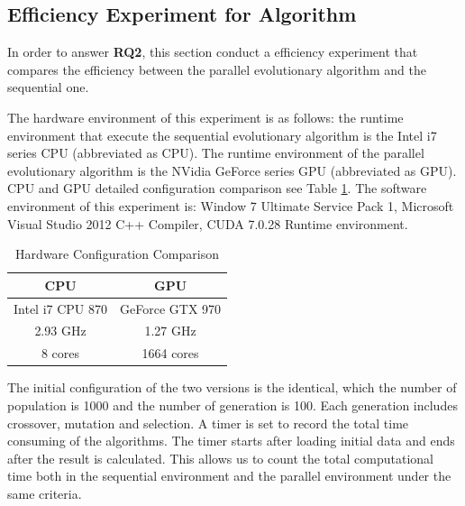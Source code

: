 \subsection{Efficiency Experiment for Algorithm}
%
In order to answer \textbf{RQ2}, this section conduct a efficiency experiment
that compares the efficiency between the parallel evolutionary algorithm and the
sequential one.

The hardware environment of this experiment is as follows: the runtime
environment that execute the sequential evolutionary algorithm is the Intel i7
series CPU (abbreviated as CPU). The runtime environment of the parallel
evolutionary algorithm is the NVidia GeForce series GPU (abbreviated as GPU).
CPU and GPU detailed configuration comparison see Table \ref{tab:cpugpu}. The
software environment of this experiment is: Window 7 Ultimate Service Pack 1,
Microsoft Visual Studio 2012 C++ Compiler, CUDA 7.0.28 Runtime environment.

\begin{table}[!ht]
  \centering
  \caption{Hardware Configuration Comparison}
  \label{tab:cpugpu}
  \begin{tabular}{c|c}
    \hline
    CPU & GPU  \\
    \hline
    \hspace{.5cm} Intel i7 CPU 870 \hspace{.5cm} & \hspace{.5cm} GeForce GTX 970 \hspace{.5cm} \\
    2.93 GHz & 1.27 GHz \\
    8 cores & 1664 cores \\
    \hline
  \end{tabular}
\end{table}

The initial configuration of the two versions is the identical, which the number
of population is 1000 and the number of generation is 100. Each generation
includes crossover, mutation and selection. A timer is set to record the total
time consuming of the algorithms. The timer starts after loading initial data
and ends after the result is calculated. This allows us to count the total
computational time both in the sequential environment and the parallel
environment under the same criteria.



